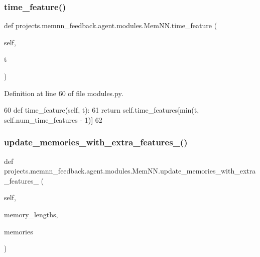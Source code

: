 \subsubsection{\texorpdfstring{time\+\_\+feature()}{time\_feature()}}
{\footnotesize\ttfamily def projects.\+memnn\+\_\+feedback.\+agent.\+modules.\+Mem\+N\+N.\+time\+\_\+feature (\begin{DoxyParamCaption}\item[{}]{self,  }\item[{}]{t }\end{DoxyParamCaption})}



Definition at line 60 of file modules.\+py.


\begin{DoxyCode}
60     \textcolor{keyword}{def }time\_feature(self, t):
61         \textcolor{keywordflow}{return} self.time\_features[min(t, self.num\_time\_features - 1)]
62 
\end{DoxyCode}
\mbox{\label{classprojects_1_1memnn__feedback_1_1agent_1_1modules_1_1MemNN_a0842ffd89a6a7b05ecd96ffd9167ec25}} 
\subsubsection{\texorpdfstring{update\+\_\+memories\+\_\+with\+\_\+extra\+\_\+features\+\_\+()}{update\_memories\_with\_extra\_features\_()}}
{\footnotesize\ttfamily def projects.\+memnn\+\_\+feedback.\+agent.\+modules.\+Mem\+N\+N.\+update\+\_\+memories\+\_\+with\+\_\+extra\+\_\+features\+\_\+ (\begin{DoxyParamCaption}\item[{}]{self,  }\item[{}]{memory\+\_\+lengths,  }\item[{}]{memories }\end{DoxyParamCaption})}



